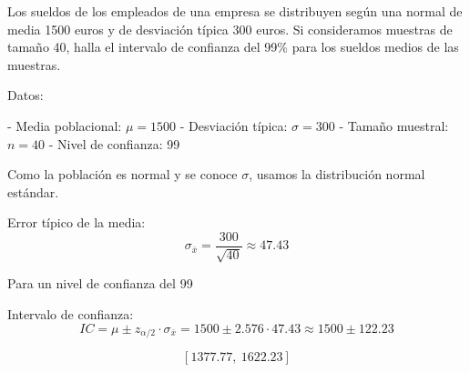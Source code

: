 \documentclass[addpoints,spanish, 12pt,a4paper]{exam}
\renewcommand*\half{.5}
\begin{document}
\begin{questions}
\question[1\half] Los sueldos de los empleados de una empresa se distribuyen según una normal de media 1500 euros y de desviación típica 300 euros. Si consideramos muestras de tamaño 40, halla el intervalo de confianza del 99\% para los sueldos medios de las muestras.

\begin{solution}
Datos:

- Media poblacional: \( \mu = 1500 \)
- Desviación típica: \( \sigma = 300 \)
- Tamaño muestral: \( n = 40 \)
- Nivel de confianza: 99%

Como la población es normal y se conoce \( \sigma \), usamos la distribución normal estándar.

Error típico de la media:
\[
\sigma_{\bar{x}} = \frac{300}{\sqrt{40}} \approx 47.43
\]

Para un nivel de confianza del 99%

Intervalo de confianza:
\[
IC = \mu \pm z_{\alpha/2} \cdot \sigma_{\bar{x}} = 1500 \pm 2.576 \cdot 47.43 \approx 1500 \pm 122.23
\]

\[
\boxed{[1377.77,\ 1622.23]}
\]
\end{solution}


\end{questions}
\end{document}
